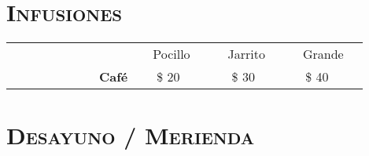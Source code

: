 \section{\textsc{\textbf{Infusiones}}}

\begin{table}
 \begin{tabular}{l c c c } 
 ~ & $ \> \> \> $ Pocillo $\> \> \> $ & $\> \> \> $ Jarrito $\> \> \> $ & $\> \> \> $ Grande $\> \> \> $ \\ %
$\> \> \> \>  \> \> \> \> \> \> \> \> \> \> \> \>  $ $\> \> \> \>  \> \> \> \> \> \> \> \> $ 
\textbf{Café} & $\> \> \> $ \$ 20    & $\> \> \> $ \$ 30    & \$ 40   \\
 \end{tabular}
\end{table}

\section{\textsc{\textbf{Desayuno / Merienda}}}



